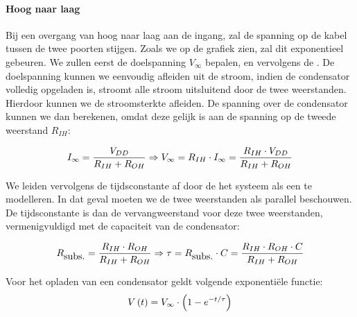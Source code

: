 \paragraph{Hoog naar laag}
Bij een overgang van hoog naar laag aan de ingang, zal de spanning op de kabel tussen de twee poorten stijgen. Zoals we op de grafiek zien, zal dit exponentieel gebeuren. We zullen eerst de doelspanning $V_{\infty}$ bepalen, en vervolgens de . De doelspanning kunnen we eenvoudig afleiden uit de stroom, indien de condensator volledig opgeladen is, stroomt alle stroom uitsluitend door de twee weerstanden. Hierdoor kunnen we de stroomsterkte afleiden. De spanning over de condensator kunnen we dan berekenen, omdat deze gelijk is aan de spanning op de tweede weerstand $R_{IH}$:

\begin{equation}
I_{\infty}=\displaystyle\frac{V_{DD}}{R_{IH}+R_{OH}}\Rightarrow V_{\infty}=R_{IH}\cdot I_{\infty}=\displaystyle\frac{R_{IH}\cdot V_{DD}}{R_{IH}+R_{OH}}
\eqnlab{vInfty}
\end{equation}

We leiden vervolgens de tijdsconstante af door de het systeem als een  te modelleren. In dat geval moeten we de twee weerstanden als parallel beschouwen. De tijdsconstante is dan de vervangweerstand voor deze twee weerstanden, vermenigvuldigd met de capaciteit van de condensator:

\begin{equation}
R_{\mbox{subs.}}=\displaystyle\frac{R_{IH}\cdot R_{OH}}{R_{IH}+R_{OH}}\Rightarrow \tau=R_{\mbox{subs.}}\cdot C=\displaystyle\frac{R_{IH}\cdot R_{OH}\cdot C}{R_{IH}+R_{OH}}
\eqnlab{tauHL}
\end{equation}

Voor het opladen van een condensator geldt volgende exponenti\"ele functie:
\begin{equation}
V\left( t \right)=V_{\infty}\cdot\left( 1-e^{-t/\tau} \right)
\end{equation}

